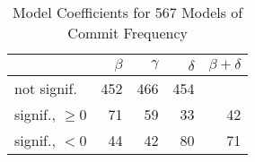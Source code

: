 
\begin{table}[t] \centering
\small
  \caption{Model Coefficients for 567 Models of Commit Frequency}
  \label{Table:rddmodels_freq}
\begin{tabular}{ l  r r r r }        
\hline 

 & $\beta$ & $\gamma$ & $\delta$ & $\beta + \delta$ \\ 
 \hline 
 \hline
not signif. & 452 & 466 & 454 & \\
\hline
signif., $\ge 0$ & 71 & 59 & 33 & 42 \\
\hline
signif., $<0$ & 44 & 42 & 80 & 71 \\
\hline
\end{tabular}
\end{table}